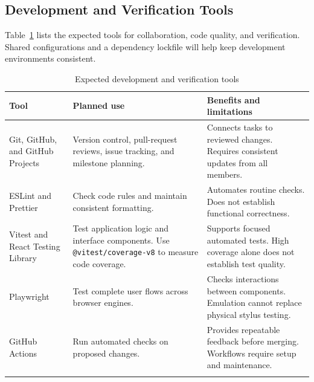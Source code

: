 \documentclass{article}
\begin{document}
\subsection{Development and Verification Tools}

Table~\ref{tab:development-tools} lists the expected tools for
collaboration, code quality, and verification. Shared configurations
and a dependency lockfile will help keep development environments
consistent.

\begin{table}[htbp]
    \centering
    \caption{Expected development and verification tools}
    \label{tab:development-tools}
    \small
    \renewcommand{\arraystretch}{1.15}
    \begin{tabularx}{\textwidth}{
        @{}>{\raggedright\arraybackslash}p{}
        >{\raggedright\arraybackslash}X
        >{\raggedright\arraybackslash}X@{}
    }
        \toprule
        \textbf{Tool} &
        \textbf{Planned use} &
        \textbf{Benefits and limitations} \\
        \midrule

        Git, GitHub, and GitHub Projects &
        Version control, pull-request reviews, issue tracking,
        and milestone planning. &
        Connects tasks to reviewed changes.
        Requires consistent updates from all members. \\
        \addlinespace

        ESLint and Prettier &
        Check code rules and maintain consistent formatting. &
        Automates routine checks.
        Does not establish functional correctness. \\
        \addlinespace

        Vitest and React Testing Library &
        Test application logic and interface components.
        Use \texttt{@vitest/coverage-v8} to measure code coverage. &
        Supports focused automated tests.
        High coverage alone does not establish test quality. \\
        \addlinespace

        Playwright &
        Test complete user flows across browser engines. &
        Checks interactions between components.
        Emulation cannot replace physical stylus testing. \\
        \addlinespace

        GitHub Actions &
        Run automated checks on proposed changes. &
        Provides repeatable feedback before merging.
        Workflows require setup and maintenance. \\
        \addlinespace


\end{tabularx}
\end{table}
\end{document}
